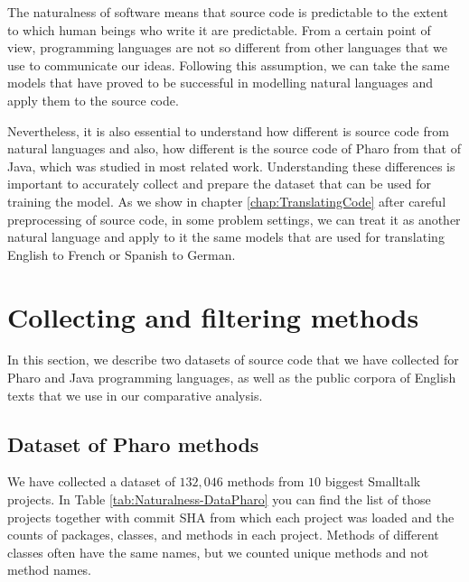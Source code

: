 The naturalness of software means that source code is predictable to the extent to which human beings who write it are predictable. From a certain point of view, programming languages are not so different from other languages that we use to communicate our ideas. Following this assumption, we can take the same models that have proved to be successful in modelling natural languages and apply them to the source code.

Nevertheless, it is also essential to understand how different is source code from natural languages and also, how different is the source code of Pharo from that of Java, which was studied in most related work. Understanding these differences is important to accurately collect and prepare the dataset that can be used for training the model. As we show in chapter \ref{chap:TranslatingCode} after careful preprocessing of source code, in some problem settings, we can treat it as another natural language and apply to it the same models that are used for translating English to French or Spanish to German.

\section{Collecting and filtering methods}
\label{sec:Naturalness-Data}

In this section, we describe two datasets of source code that we have collected for Pharo and Java programming languages, as well as the public corpora of English texts that we use in our comparative analysis.

\subsection{Dataset of Pharo methods}
\label{sec:Naturalness-DataPharo}

We have collected a dataset of $132,046$ methods from $10$ biggest Smalltalk projects. In Table \ref{tab:Naturalness-DataPharo} you can find the list of those projects together with commit SHA from which each project was loaded and the counts of packages, classes, and methods in each project. Methods of different classes often have the same names, but we counted unique methods and not method names.

